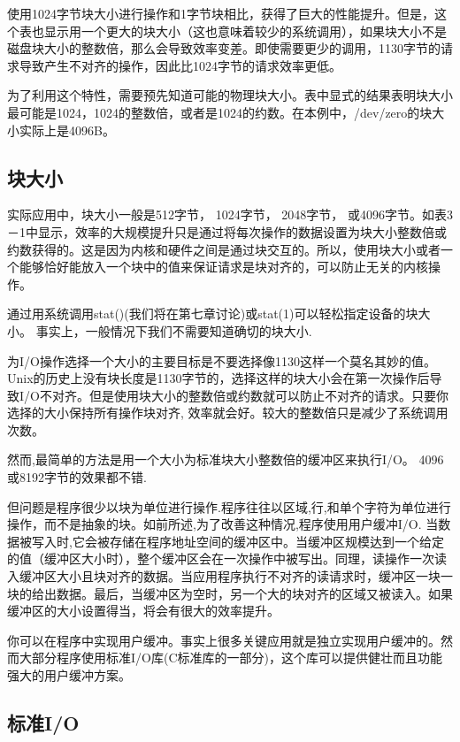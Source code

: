 使用1024字节块大小进行操作和1字节块相比，获得了巨大的性能提升。但是，这个表也显示用一个更大的块大小（这也意味着较少的系统调用），如果块大小不是磁盘块大小的整数倍，那么会导致效率变差。即使需要更少的调用，1130字节的请求导致产生不对齐的操作，因此比1024字节的请求效率更低。

为了利用这个特性，需要预先知道可能的物理块大小。表中显式的结果表明块大小最可能是1024，1024的整数倍，或者是1024的约数。在本例中，/dev/zero的块大小实际上是4096B。

\subsection{块大小}

实际应用中，块大小一般是512字节， 1024字节， 2048字节， 或4096字节。如表3－1中显示，效率的大规模提升只是通过将每次操作的数据设置为块大小整数倍或约数获得的。这是因为内核和硬件之间是通过块交互的。所以，使用块大小或者一个能够恰好能放入一个块中的值来保证请求是块对齐的，可以防止无关的内核操作。

通过用系统调用stat()(我们将在第七章讨论)或stat(1)可以轻松指定设备的块大小。 事实上，一般情况下我们不需要知道确切的块大小.

为I/O操作选择一个大小的主要目标是不要选择像1130这样一个莫名其妙的值。Unix的历史上没有块长度是1130字节的，选择这样的块大小会在第一次操作后导致I/O不对齐。但是使用块大小的整数倍或约数就可以防止不对齐的请求。只要你选择的大小保持所有操作块对齐, 效率就会好。较大的整数倍只是减少了系统调用次数。

然而,最简单的方法是用一个大小为标准块大小整数倍的缓冲区来执行I/O。 4096或8192字节的效果都不错.

但问题是程序很少以块为单位进行操作.程序往往以区域,行,和单个字符为单位进行操作，而不是抽象的块。如前所述,为了改善这种情况,程序使用用户缓冲I/O. 当数据被写入时,它会被存储在程序地址空间的缓冲区中。当缓冲区规模达到一个给定的值（缓冲区大小时），整个缓冲区会在一次操作中被写出。同理，读操作一次读入缓冲区大小且块对齐的数据。当应用程序执行不对齐的读请求时，缓冲区一块一块的给出数据。最后，当缓冲区为空时，另一个大的块对齐的区域又被读入。如果缓冲区的大小设置得当，将会有很大的效率提升。

你可以在程序中实现用户缓冲。事实上很多关键应用就是独立实现用户缓冲的。然而大部分程序使用标准I/O库(C标准库的一部分)，这个库可以提供健壮而且功能强大的用户缓冲方案。

\subsection{标准I/O}

